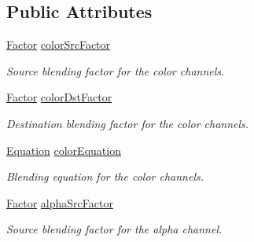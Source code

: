 \subsection*{Public Attributes}
\begin{DoxyCompactItemize}
\item 
\mbox{\label{structsf_1_1_blend_mode_a32d1a55dbfada86a06d9b881dc8ccf7b}} 
\mbox{\hyperlink{structsf_1_1_blend_mode_afb9852caf356b53bb0de460c58a9ebbb}{Factor}} \mbox{\hyperlink{structsf_1_1_blend_mode_a32d1a55dbfada86a06d9b881dc8ccf7b}{color\+Src\+Factor}}
\begin{DoxyCompactList}\small\item\em Source blending factor for the color channels. \end{DoxyCompactList}\item 
\mbox{\label{structsf_1_1_blend_mode_adee68ee59e7f1bf71d12db03d251104d}} 
\mbox{\hyperlink{structsf_1_1_blend_mode_afb9852caf356b53bb0de460c58a9ebbb}{Factor}} \mbox{\hyperlink{structsf_1_1_blend_mode_adee68ee59e7f1bf71d12db03d251104d}{color\+Dst\+Factor}}
\begin{DoxyCompactList}\small\item\em Destination blending factor for the color channels. \end{DoxyCompactList}\item 
\mbox{\label{structsf_1_1_blend_mode_aed12f06eb7f50a1b95b892b0964857b1}} 
\mbox{\hyperlink{structsf_1_1_blend_mode_a7bce470e2e384c4f9c8d9595faef7c32}{Equation}} \mbox{\hyperlink{structsf_1_1_blend_mode_aed12f06eb7f50a1b95b892b0964857b1}{color\+Equation}}
\begin{DoxyCompactList}\small\item\em Blending equation for the color channels. \end{DoxyCompactList}\item 
\mbox{\label{structsf_1_1_blend_mode_aa94e44f8e1042a7357e8eff78c61a1be}} 
\mbox{\hyperlink{structsf_1_1_blend_mode_afb9852caf356b53bb0de460c58a9ebbb}{Factor}} \mbox{\hyperlink{structsf_1_1_blend_mode_aa94e44f8e1042a7357e8eff78c61a1be}{alpha\+Src\+Factor}}
\begin{DoxyCompactList}\small\item\em Source blending factor for the alpha channel. \end{DoxyCompactList}\item 

\end{DoxyCompactItemize}
